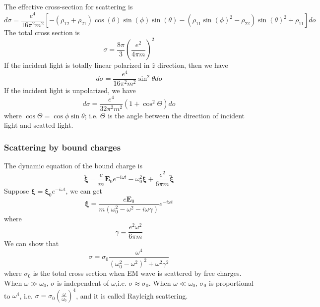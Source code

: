 The effective cross-section for scattering is
\[d\sigma = \frac{e^4}{16\pi^2 m^2}[-(\rho_{12}+\rho_{21})\cos\left({\theta}\right)\sin\left({\phi}\right)
\sin\left({\theta}\right) - {\left(\rho_{11} \sin\left({\phi}\right)^{2}
- \rho_{22}\right)} \sin\left({\theta}\right)^{2} + \rho_{11} ]do\]
The total cross section is
\[\sigma = \frac{8\pi}{3} \left( \frac{e^2}{4\pi m} \right)^2\]
If the incident light is totally linear polarized in $\hat{z}$ direction, then we have
\[d\sigma = \frac{e^4}{16\pi^2 m^2} \sin^2\theta do\]
If the incident light is unpolarized, we have
\[d\sigma = \frac{e^4}{32\pi^2 m^2}\left(1 +  \cos^2\Theta \right)do\]
where $\cos\Theta = \cos\phi\sin\theta$; i.e. $\Theta$ is the angle between the direction of incident light and scatted light.

\subsubsection{Scattering by bound charges}
The dynamic equation of the bound charge is
\[\ddot{\bm{\xi}} = \frac{e}{m}\bm{E}_0e^{-i\omega t} - \omega_0^2 \bm{\xi} + \frac{e^2}{6\pi m} \dddot{\bm{\xi}}\]
Suppose $\bm{\xi} = \bm{\xi}_0 e^{-i\omega t}$, we can get
\[\bm{\xi} = \frac{e\bm{E}_0}{m(\omega_0^2 - \omega^2 - i\omega \gamma)} e^{-i\omega t}\]
where
\[\gamma \equiv \frac{e^2 \omega^2}{6\pi m}\]
We can show that
\[\sigma = \sigma_0 \frac{\omega^4}{(\omega_0^2-\omega^2)^2 + \omega^2 \gamma^2}\]
where $\sigma_0$ is the total cross section when EM wave is scattered by free charges. When $\omega \gg \omega_0$, $\sigma$ is independent of $\omega$,i.e. $\sigma \approx \sigma_0$. When $\omega \ll \omega_0$, $\sigma_0$ is proportional to $\omega^4$, i.e. $\sigma = \sigma_0 \left(\frac{\omega}{\omega_0}\right)^4$, and it is called Rayleigh scattering.
